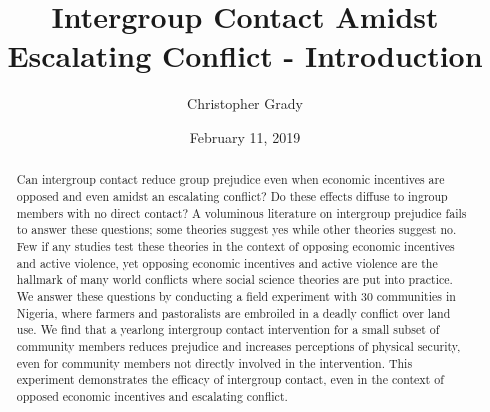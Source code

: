 \documentclass[11pt]{article}
\title{Intergroup Contact Amidst Escalating Conflict - Introduction}
\author{
Christopher Grady
}
\date{February 11, 2019}
\begin{document}
\VerbatimFootnotes

%
%
%
%
%
%
%
%
%
%

\maketitle

\begin{abstract}

Can intergroup contact reduce group prejudice even when economic incentives are opposed and even amidst an escalating conflict?  Do these effects diffuse to ingroup members with no direct contact?  A voluminous literature on intergroup prejudice fails to answer these questions; some theories suggest yes while other theories suggest no.  Few if any studies test these theories in the context of opposing economic incentives and active violence, yet opposing economic incentives and active violence are the hallmark of many world conflicts where social science theories are put into practice.  We answer these questions by conducting a field experiment with 30 communities in Nigeria, where farmers and pastoralists are embroiled in a deadly conflict over land use.  We find that a yearlong intergroup contact intervention for a small subset of community members reduces prejudice and increases perceptions of physical security, even for community members not directly involved in the intervention.  This experiment demonstrates the efficacy of intergroup contact, even in the context of opposed economic incentives and escalating conflict. 

\end{abstract}
\end{document}
